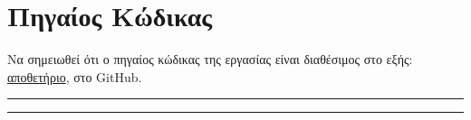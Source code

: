 





\clearpage
\appendix

\section{Πηγαίος Κώδικας}
Να σημειωθεί ότι ο πηγαίος κώδικας της εργασίας είναι διαθέσιμος στο εξής:
\href{https://github.com/DimitrisDimitropoulos/desalination}{αποθετήριο}, στο
GitHub.

\par\noindent\rule{\textwidth}{0.4pt}

\par\noindent\rule{\textwidth}{0.4pt}


